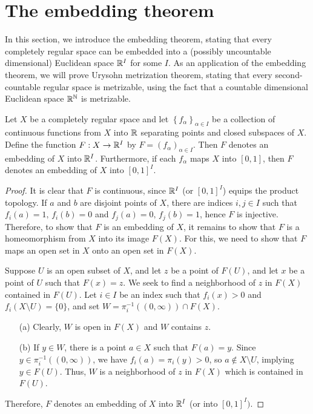 \section{The embedding theorem}

In this section, we introduce the embedding theorem, stating that every completely regular space can be embedded into a (possibly uncountable dimensional) Euclidean space ${\mathbb{R}}^I$ for some $I$.
As an application of the embedding theorem, we will prove Urysohn metrization theorem, stating that every second-countable regular space is metrizable, using the fact that a countable dimensional Euclidean space ${\mathbb{R}}^{\mathbb{N}}$ is metrizable.

\begin{thm}
    Let $X$ be a completely regular space and let $\left\{f_\alpha\right\}_{\alpha\in I}$ be a collection of continuous functions from $X$ into ${\mathbb{R}}$ separating points and closed subspaces of $X$.
    Define the function $F: X\rightarrow{\mathbb{R}}^I$ by $F=(f_\alpha)_{\alpha\in I}$.
    Then $F$ denotes an embedding of $X$ into ${\mathbb{R}}^I$.
    Furthermore, if each $f_\alpha$ maps $X$ into $[0, 1]$, then $F$ denotes an embedding of $X$ into $[0, 1]^I$.
\end{thm}
\begin{proof}
    It is clear that $F$ is continuous, since ${\mathbb{R}}^I$ (or $[0, 1]^I$) equips the product topology.
    If $a$ and $b$ are disjoint points of $X$, there are indices $i, j\in I$ such that $f_i(a)=1,\, f_i(b)=0$ and $f_j(a)=0,\, f_j(b)=1$, hence $F$ is injective.
    Therefore, to show that $F$ is an embedding of $X$, it remains to show that $F$ is a homeomorphism from $X$ into its image $F(X)$.
    For this, we need to show that $F$ maps an open set in $X$ onto an open set in $F(X)$.
    
    Suppose $U$ is an open subset of $X$, and let $z$ be a point of $F(U)$, and let $x$ be a point of $U$ such that $F(x)=z$.
    We seek to find a neighborhood of $z$ in $F(X)$ contained in $F(U)$.
    Let $i\in I$ be an index such that $f_i(x)>0$ and $f_i(X\setminus U)=\{0\}$, and set $W=\pi_i^{-1}((0, \infty))\cap F(X)$.
    \begin{enumerate}
        \item[(a)] Clearly, $W$ is open in $F(X)$ and $W$ contains $z$.
        \item[(b)] If $y\in W$, there is a point $a\in X$ such that $F(a)=y$.
        Since $y\in\pi_i^{-1}((0, \infty))$, we have $f_i(a)=\pi_i(y)>0$, so $a\notin X\setminus U$, implying $y\in F(U)$.
        Thus, $W$ is a neighborhood of $z$ in $F(X)$ which is contained in $F(U)$.
    \end{enumerate}
    Therefore, $F$ denotes an embedding of $X$ into ${\mathbb{R}}^I$ (or into $[0, 1]^I)$.
\end{proof}

